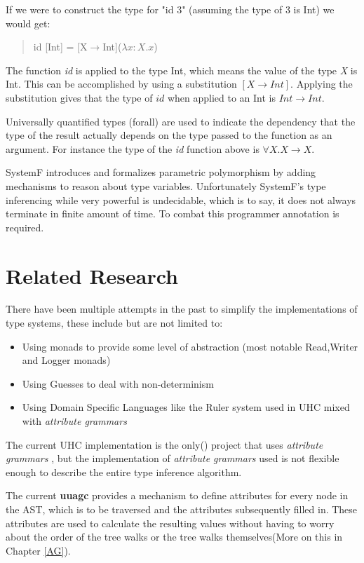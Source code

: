 \documentclass[twoside, titlepage, openright, a4paper]{book}
\newcommand{\Varid}[1]{\mathit{#1}}
\newcommand{\ba}[1]{$[#1]$}
\newcommand{\ags}{\emph{attribute grammars }}
\begin{document}
If we were to construct the type for "id 3" (assuming the type of 3 is Int) we would get:

\begin{quotation}
id [Int] = [X$\rightarrow$Int]($\lambda x:X. x$)
\end{quotation}

The function \emph{id} is applied to the type Int, which means the value of the type \emph{X} is Int. This can be accomplished by using a substitution \ba{X\rightarrow Int}. Applying the substitution gives that the type of \ensuremath{\Varid{id}} when applied to an Int is $Int \rightarrow Int$.

Universally quantified types (forall) are used to indicate the dependency that the type of the result actually depends on the type passed to the function as an argument. For instance the type of the \textit{id} function above is $\forall X. X\rightarrow X$.

SystemF introduces and formalizes parametric polymorphism by adding mechanisms to reason about type variables. Unfortunately SystemF's type inferencing while very powerful is undecidable, which is to say, it does not always terminate in finite amount of time. To combat this programmer annotation is required.

\section{Related Research}
There have been multiple attempts in the past to simplify the implementations of type systems, these include but are not limited to:

\begin{itemize}
\item Using monads\cite{Monads} to provide some level of abstraction (most notable Read,Writer and Logger monads)
\item Using Guesses\cite{Guesses} to deal with non-determinism 
\item Using Domain Specific Languages like the Ruler\cite{Ruler} system used in UHC mixed with \ags
\end{itemize}

The current UHC implementation is the only(\cite{UHC}) project that uses \ags, but the implementation of \ags used is not flexible enough to describe the entire type inference algorithm.

The current \textbf{uuagc} provides a mechanism to define attributes for every node in the AST, which is to be traversed and the attributes subsequently filled in. These attributes are used to calculate the resulting values without having to worry about the order of the tree walks or the tree walks themselves(More on this in Chapter \ref{AG}).
\end{document}
